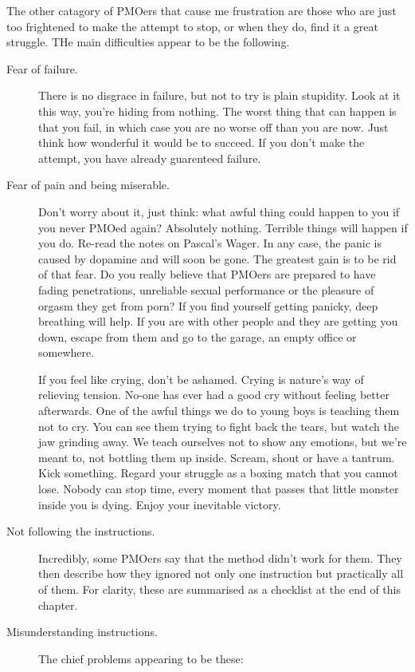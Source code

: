 \documentclass[easypeasy.tex]{subfiles}
\begin{document}
The other catagory of PMOers that cause me frustration are those who are just too frightened to make the attempt to stop, or when they do, find it a great struggle. THe main difficulties appear to be the following.
\begin{description}
  \item [Fear of failure.] There is no disgrace in failure, but not to try is plain stupidity. Look at it this way, you're hiding from nothing. The worst thing that can happen is that you fail, in which case you are no worse off than you are now. Just think how wonderful it would be to succeed. If you don't make the attempt, you have already guarenteed failure.

  \item [Fear of pain and being miserable.] Don't worry about it, just think: what awful thing could happen to you if you never PMOed again? Absolutely nothing. Terrible things will happen if you do. Re-read the notes on Pascal's Wager. In any case, the panic is caused by dopamine and will soon be gone. The greatest gain is to be rid of that fear. Do you really believe that PMOers are prepared to have fading penetrations, unreliable sexual performance or the pleasure of orgasm they get from porn? If you find yourself getting panicky, deep breathing will help. If you are with other people and they are getting you down, escape from them and go to the garage, an empty office or somewhere.

  If you feel like crying, don't be ashamed. Crying is nature's way of relieving tension. No-one has ever had a good cry without feeling better afterwards. One of the awful things we do to young boys is teaching them not to cry. You can see them trying to fight back the tears, but watch the jaw grinding away. We teach ourselves not to show any emotions, but we're meant to, not bottling them up inside. Scream, shout or have a tantrum. Kick something. Regard your struggle as a boxing match that you cannot lose. Nobody can stop time, every moment that passes that little monster inside you is dying. Enjoy your inevitable victory. 

  \item [Not following the instructions.] Incredibly, some PMOers say that the method didn't work for them. They then describe how they ignored not only one instruction but practically all of them. For clarity, these are summarised as a checklist at the end of this chapter.

  \item [Misunderstanding instructions.] The chief problems appearing to be these:


\end{description}
\end{document}
